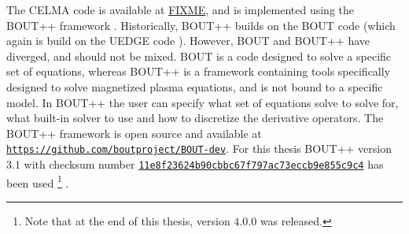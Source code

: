 \label{chap:BOUT++}
The CELMA code is available at \href{FIXME}{FIXME}, and is implemented using the BOUT++ framework \cite{Dudson2009,Dudson2014a,Dudson2016}.
Historically, BOUT++ builds on the BOUT code \cite{Xu1998} (which again is build on the UEDGE code \cite{Rognlien1996}).
However, BOUT and BOUT++ have diverged, and should not be mixed.
BOUT is a code designed to solve a specific set of equations, whereas BOUT++ is a framework containing tools specifically designed to solve magnetized plasma equations, and is not bound to a specific model.
In BOUT++ the user can specify what set of equations solve to solve for, what built-in solver to use and how to discretize the derivative operators.
The BOUT++ framework is open source and available at \href{https://github.com/boutproject/BOUT-dev}{\texttt{https://github.com/boutproject/BOUT-dev}}.
For this thesis BOUT++ version $3.1$ with checksum number \href{https://github.com/boutproject/BOUT-dev/releases/tag/v3.1}{\texttt{11e8f23624b90cbbc67f797ac73eccb9e855c9c4}} has been used%
%
\footnote{Note that at the end of this thesis, version $4.0.0$ was released.}%
%
.
